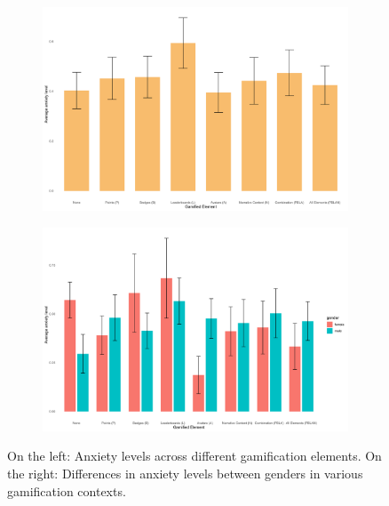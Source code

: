 \begin{figure}[h]
    \centering
    \begin{subfigure}[b]{0.45\textwidth}
        \includegraphics[width=\textwidth]{img/plots/plot_anxiety.png}
    \end{subfigure}
    \hfill
    \begin{subfigure}[b]{0.45\textwidth}
        \includegraphics[width=\textwidth]{img/plots/plot_anxiety_gender.png}
    \end{subfigure}
    \caption{On the left: Anxiety levels across different gamification elements. On the right: Differences in anxiety levels between genders in various gamification contexts.}
    \label{fig:anxiety_comparison}
\end{figure}

